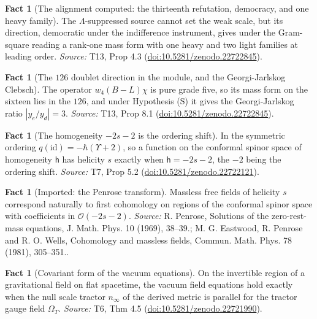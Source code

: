 \documentclass[11pt]{article}
\theoremstyle{definition}
\newtheorem{fact}[theorem]{Fact}
\theoremstyle{plain}
\newcommand{\changedmark}[2]{\marginpar{\raggedright\scriptsize\color{#1}#2}}
\providecommand{\id}{}\renewcommand{\id}{\mathrm{id}}
\providecommand{\nInf}{}\renewcommand{\nInf}{n_\infty}
\begin{document}
\begin{fact}[The alignment computed: the thirteenth refutation, democracy, and one heavy family]\label{c:families.alignment-computed-thirteenth-refutation-democracy-one}
The $\Lambda$-suppressed source cannot set the weak scale, but its direction, democratic under the indifference instrument, gives under the Gram-square reading a rank-one mass form with one heavy and two light families at leading order.
\emph{Source:} T13, Prop 4.3 (\href{https://doi.org/10.5281/zenodo.22722845}{doi:10.5281/zenodo.22722845}).
\end{fact}

\begin{fact}[The $126$ doublet direction in the module, and the Georgi-Jarlskog Clebsch]\label{c:families.doublet-direction-module-georgi-jarlskog-clebsch}
\changedmark{gray}{reworded}
The operator $w_{4}(B - L)\chi$ is pure grade five, so its mass form on the sixteen lies in the $126$, and under Hypothesis (S) it gives the Georgi-Jarlskog ratio $|y_{e}/y_{d}| = 3$.
\emph{Source:} T13, Prop 8.1 (\href{https://doi.org/10.5281/zenodo.22722845}{doi:10.5281/zenodo.22722845}).
\end{fact}

\begin{fact}[The homogeneity $-2s-2$ is the ordering shift]\label{c:hawking.homogeneity-ordering-shift}
In the symmetric ordering $q(\id) = -\hbar(\Upsilon + 2)$, so a function on the conformal spinor space of homogeneity $\mathsf{h}$ has helicity $s$ exactly when $\mathsf{h} = -2s - 2$, the $-2$ being the ordering shift.
\emph{Source:} T7, Prop 5.2 (\href{https://doi.org/10.5281/zenodo.22722121}{doi:10.5281/zenodo.22722121}).
\end{fact}

\begin{fact}[Imported: the Penrose transform]\label{c:hawking.imported-penrose-transform}
Massless free fields of helicity $s$ correspond naturally to first cohomology on regions of the conformal spinor space with coefficients in $\mathcal{O}(-2s-2)$.
\emph{Source:} R. Penrose, Solutions of the zero-rest-mass equations, J. Math. Phys. 10 (1969), 38--39.; M. G. Eastwood, R. Penrose and R. O. Wells, Cohomology and massless fields, Commun. Math. Phys. 78 (1981), 305--351..
\end{fact}

\begin{fact}[Covariant form of the vacuum equations]\label{c:interior.covariant-form-vacuum-equations}
On the invertible region of a gravitational field on flat spacetime, the vacuum field equations hold exactly when the null scale tractor $\nInf$ of the derived metric is parallel for the tractor gauge field $\Omega_{T}$.
\emph{Source:} T6, Thm 4.5 (\href{https://doi.org/10.5281/zenodo.22721990}{doi:10.5281/zenodo.22721990}).
\end{fact}
\end{document}

